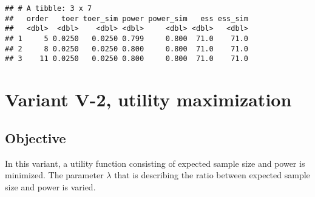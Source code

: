 \documentclass[
]{book}
\newenvironment{Shaded}{\begin{snugshade}}{\end{snugshade}}
\newcommand{\DecValTok}[1]{\textcolor[rgb]{0.00,0.00,0.81}{#1}}
\newcommand{\FunctionTok}[1]{\textcolor[rgb]{0.00,0.00,0.00}{#1}}
\newcommand{\NormalTok}[1]{#1}
\newcommand{\SpecialCharTok}[1]{\textcolor[rgb]{0.00,0.00,0.00}{#1}}
\begin{document}
\begin{Shaded}
\end{Shaded}

\begin{verbatim}
## # A tibble: 3 x 7
##   order   toer toer_sim power power_sim   ess ess_sim
##   <dbl>  <dbl>    <dbl> <dbl>     <dbl> <dbl>   <dbl>
## 1     5 0.0250   0.0250 0.799     0.800  71.0    71.0
## 2     8 0.0250   0.0250 0.800     0.800  71.0    71.0
## 3    11 0.0250   0.0250 0.800     0.800  71.0    71.0
\end{verbatim}

\hypertarget{variantV_2}{%
\section{Variant V-2, utility maximization}\label{variantV_2}}

\hypertarget{objective-11}{%
\subsection{Objective}\label{objective-11}}

In this variant, a utility function consisting of expected sample size and
power is minimized.
The parameter \(\lambda\) that is describing the ratio between expected
sample size and power is varied.
\end{document}

